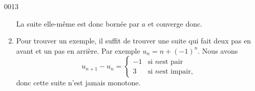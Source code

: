\begin{corrige}{0013}
\begin{enumerate}
La suite elle-même est donc bornée par $a$ et converge donc.

\item Pour trouver un exemple, il suffit de trouver une suite qui fait deux pas en avant et un pas en arrière. Par exemple $u_n=n+(-1)^n$. Nous avons
\begin{equation}
	u_{n+1}-u_n=
\begin{cases}
    -1	&	\text{si }n \text{est pair}\\
    3	&	 \text{si }n \text{est impair},
\end{cases}
\end{equation}
donc cette suite n'est jamais monotone.
\end{enumerate}

\end{corrige}

